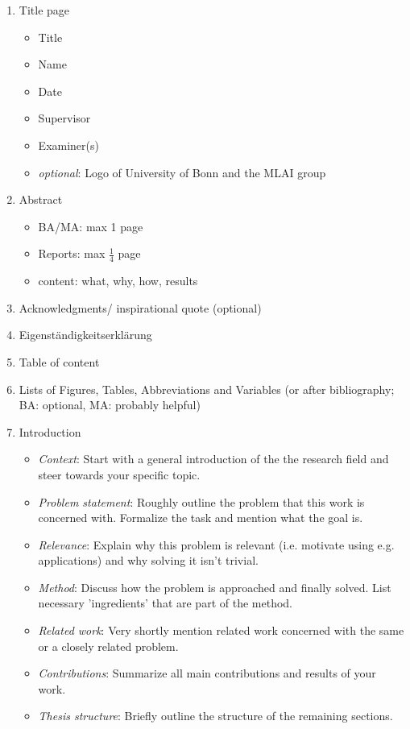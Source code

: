 \documentclass[twocolumn]{mlai-guide}
\begin{document}
\begin{enumerate}
	\item Title page
		\begin{itemize}
			\item Title
			\item Name
			\item Date
			\item Supervisor
			\item Examiner(s)
			\item \emph{optional}: Logo of University of Bonn and the MLAI group
		\end{itemize}
	\item Abstract
		\begin{itemize}
			\item BA/MA: max 1 page
			\item Reports: max $\frac{1}{4}$ page
			\item content: what, why, how, results
		\end{itemize}
	\item Acknowledgments/ inspirational quote (optional)
	\item Eigenständigkeitserklärung
	\item Table of content
	\item Lists of Figures, Tables, Abbreviations and Variables (or after bibliography; BA: optional, MA: probably helpful)
	\item Introduction
		\begin{itemize}
			\item \emph{Context}: Start with a general introduction of the the research field and steer towards your specific topic. 
			\item \emph{Problem statement}: Roughly outline the problem that this work is concerned with. Formalize the task and mention what the goal is. 
			\item \emph{Relevance}: Explain why this problem is relevant (i.e. motivate using e.g. applications) and why solving it isn't trivial. 
			\item \emph{Method}: Discuss how the problem is approached and finally solved. List necessary 'ingredients' that are part of the method. 
			\item \emph{Related work}: Very shortly mention related work concerned with the same or a closely related problem.
			\item \emph{Contributions}: Summarize all main contributions and results of your work. 
			\item \emph{Thesis structure}: Briefly outline the structure of the remaining sections. 

\end{itemize}
\end{enumerate}
\end{document}
